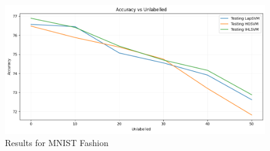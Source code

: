 \documentclass[12pt,a4paper,oneside,english]{report}
\begin{document}
\begin{figure}
	\centerline{\includegraphics[scale=0.4]{Figures/chp4/mnist_fashion.png}}
	\caption{Results for MNIST Fashion}
	\label{fig:4}
\end{figure}
\end{document}
